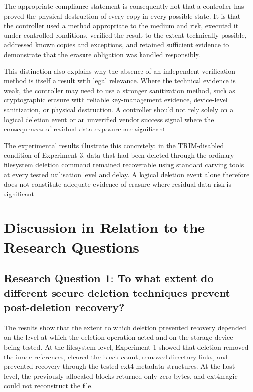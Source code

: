 The appropriate compliance statement is consequently not that a controller has proved the physical destruction of every copy in every possible state. It is that the 
controller used a method appropriate to the medium and risk, executed it under controlled conditions, verified the result to the extent technically possible, addressed 
known copies and exceptions, and retained sufficient evidence to demonstrate that the erasure obligation was handled responsibly.

This distinction also explains why the absence of an independent verification method is itself a result with legal relevance. Where the technical evidence is weak, the 
controller may need to use a stronger sanitization method, such as cryptographic erasure with reliable key-management evidence, device-level sanitization, or physical 
destruction. A controller should not rely solely on a logical deletion event or an unverified vendor success signal where the consequences of residual data exposure are 
significant.

The experimental results illustrate this concretely: in the TRIM-disabled condition of Experiment 3, data that had been deleted through the ordinary filesystem deletion command remained recoverable using standard carving tools at every tested utilisation level and delay. A logical deletion event alone therefore does not constitute adequate evidence of erasure where residual-data risk is significant.

\section{Discussion in Relation to the Research Questions}

\subsection*{Research Question 1: To what extent do different secure deletion techniques prevent post-deletion recovery?}

The results show that the extent to which deletion prevented recovery depended on the level at which the deletion operation acted and on the storage device being tested. 
At the filesystem level, Experiment 1 showed that deletion removed the inode references, cleared the block count, removed directory links, and prevented recovery 
through the tested ext4 metadata structures. At the host level, the previously allocated blocks returned only zero bytes, and ext4magic could not reconstruct the file. 

